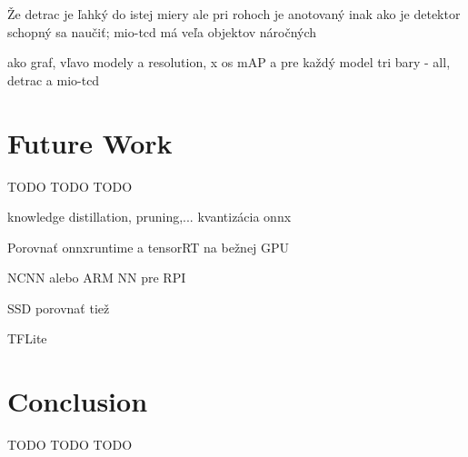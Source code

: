 Že detrac je ľahký do istej miery ale pri rohoch je anotovaný inak ako je
detektor schopný sa naučiť; mio-tcd má veľa objektov náročných

ako graf, vľavo modely a resolution, x os mAP a pre každý model tri bary - all, detrac a mio-tcd







\chapter{Future Work}

TODO TODO TODO

knowledge distillation, pruning,... kvantizácia onnx

Porovnať onnxruntime a tensorRT na bežnej GPU

NCNN alebo ARM NN pre RPI

SSD porovnať tiež

TFLite



\chapter{Conclusion}

TODO TODO TODO











